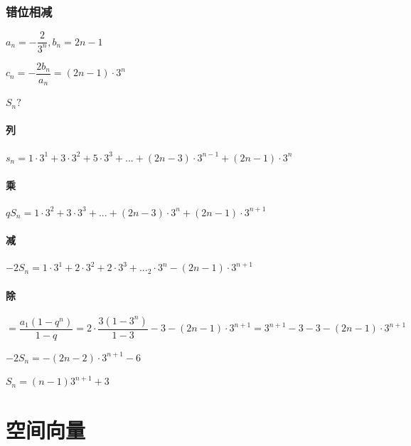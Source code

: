 \documentclass[10pt,cn]{elegantbook}
\begin{document}
\subsection{错位相减}

$a_{n}=-\dfrac{2}{3^{n}},b_{n}=2n-1$

$c_{n}=-\dfrac{2b_{n}}{a_{n}}=(2n-1)\cdot 3^{n}$

$S_{n}?$

\subsubsection{ 列}

$s_{n}=1\cdot 3^{1}+3\cdot 3^{2}+5\cdot3^{3}+...+(2n-3)\cdot 3^{n-1}+(2n-1)\cdot3^{n}$

\subsubsection{ 乘}
$qS_{n}=1\cdot 3^{2}+3\cdot 3^{3}+...+(2n-3)\cdot 3^{n}+(2n-1)\cdot3^{n+1}$

\subsubsection{ 减}

$-2S_{n}=1\cdot 3^{1}+2\cdot 3^{2}+2\cdot 3^{3}+... _2\cdot 3^{n}-(2n-1)\cdot 3^{n+1}$

\subsubsection{ 除}

$=\dfrac{a_{1}(1-q^{n})}{1-q}=2\cdot \dfrac{3(1-3^{n})}{1-3}-3-(2n-1)\cdot 3^{n+1}=3^{n+1}-3-3-(2n-1)\cdot 3^{n+1}$

$-2S_{n}=-(2n-2)\cdot 3^{n+1}-6$

$S_{n}=(n-1)3^{n+1}+3$

\chapter{空间向量}
\end{document}
